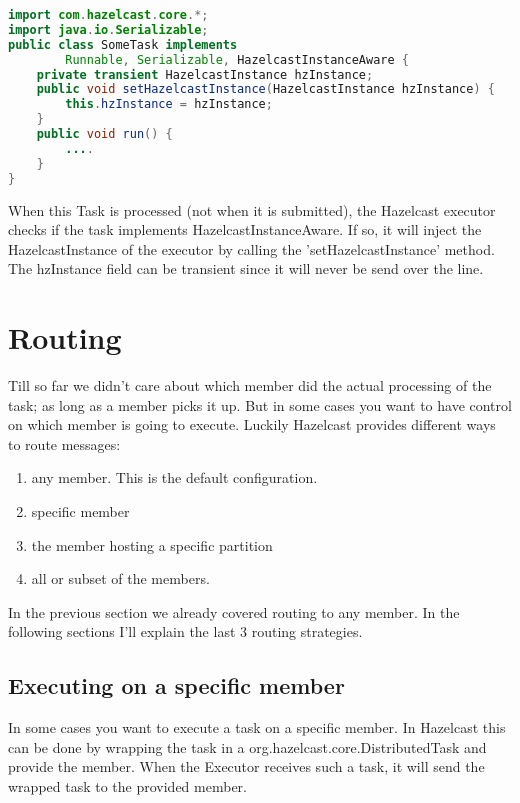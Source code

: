 \begin{lstlisting}[language=java]
import com.hazelcast.core.*;
import java.io.Serializable;
public class SomeTask implements
        Runnable, Serializable, HazelcastInstanceAware {
    private transient HazelcastInstance hzInstance;
    public void setHazelcastInstance(HazelcastInstance hzInstance) {
        this.hzInstance = hzInstance;
    }
    public void run() {
        ....
    }
}
\end{lstlisting}
When this Task is processed (not when it is submitted), the Hazelcast executor checks if the task implements HazelcastInstanceAware. If so, it will inject the HazelcastInstance of the executor by calling the 'setHazelcastInstance' method. The hzInstance field can be transient since it will never be send over the line. 

\section{Routing}
Till so far we didn't care about which member did the actual processing of the task; as long as a member picks it up. But in some cases you want to have control on which member is going to execute. Luckily Hazelcast provides different ways to route messages:
\begin{enumerate}
\item any member. This is the default configuration.
\item specific member
\item the member hosting a specific partition
\item all or subset of the members.
\end{enumerate}
In the previous section we already covered routing to any member. In the following sections I'll explain the last 3 routing strategies.

\subsection{Executing on a specific member}
In some cases you want to execute a task on a specific member. In Hazelcast this can be done by wrapping the task in a org.hazelcast.core.DistributedTask and provide the member. When the Executor receives such a task, it will send the wrapped task to the provided member.

